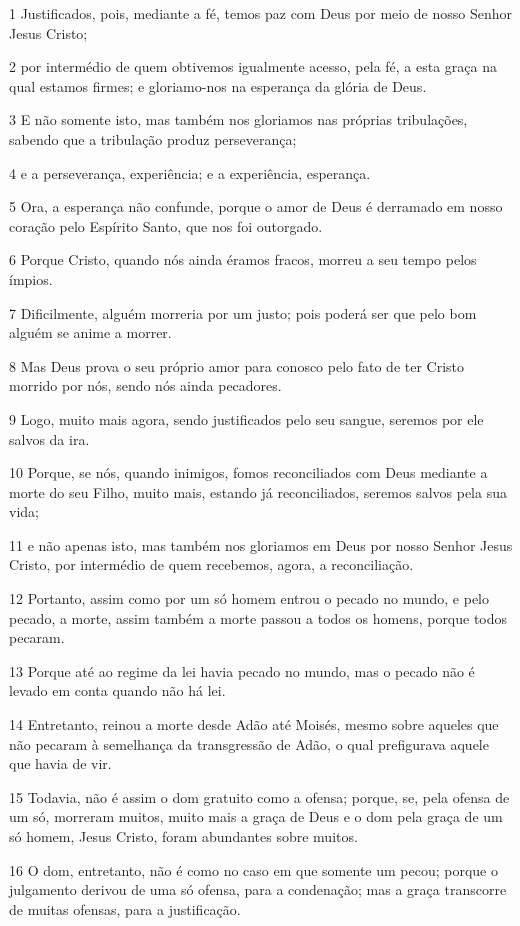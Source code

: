 \par 1 Justificados, pois, mediante a fé, temos paz com Deus por meio de nosso Senhor Jesus Cristo;
\par 2 por intermédio de quem obtivemos igualmente acesso, pela fé, a esta graça na qual estamos firmes; e gloriamo-nos na esperança da glória de Deus.
\par 3 E não somente isto, mas também nos gloriamos nas próprias tribulações, sabendo que a tribulação produz perseverança;
\par 4 e a perseverança, experiência; e a experiência, esperança.
\par 5 Ora, a esperança não confunde, porque o amor de Deus é derramado em nosso coração pelo Espírito Santo, que nos foi outorgado.
\par 6 Porque Cristo, quando nós ainda éramos fracos, morreu a seu tempo pelos ímpios.
\par 7 Dificilmente, alguém morreria por um justo; pois poderá ser que pelo bom alguém se anime a morrer.
\par 8 Mas Deus prova o seu próprio amor para conosco pelo fato de ter Cristo morrido por nós, sendo nós ainda pecadores.
\par 9 Logo, muito mais agora, sendo justificados pelo seu sangue, seremos por ele salvos da ira.
\par 10 Porque, se nós, quando inimigos, fomos reconciliados com Deus mediante a morte do seu Filho, muito mais, estando já reconciliados, seremos salvos pela sua vida;
\par 11 e não apenas isto, mas também nos gloriamos em Deus por nosso Senhor Jesus Cristo, por intermédio de quem recebemos, agora, a reconciliação.
\par 12 Portanto, assim como por um só homem entrou o pecado no mundo, e pelo pecado, a morte, assim também a morte passou a todos os homens, porque todos pecaram.
\par 13 Porque até ao regime da lei havia pecado no mundo, mas o pecado não é levado em conta quando não há lei.
\par 14 Entretanto, reinou a morte desde Adão até Moisés, mesmo sobre aqueles que não pecaram à semelhança da transgressão de Adão, o qual prefigurava aquele que havia de vir.
\par 15 Todavia, não é assim o dom gratuito como a ofensa; porque, se, pela ofensa de um só, morreram muitos, muito mais a graça de Deus e o dom pela graça de um só homem, Jesus Cristo, foram abundantes sobre muitos.
\par 16 O dom, entretanto, não é como no caso em que somente um pecou; porque o julgamento derivou de uma só ofensa, para a condenação; mas a graça transcorre de muitas ofensas, para a justificação.
